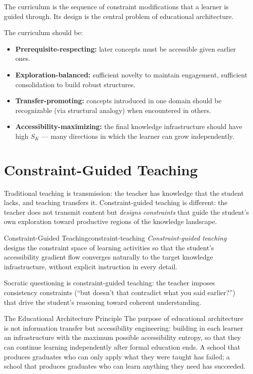 The curriculum is the sequence of constraint modifications that a
learner is guided through. Its design is the central problem of
educational architecture.

The curriculum should be:
\begin{itemize}
  \item \textbf{Prerequisite-respecting:} later concepts must be
        accessible given earlier ones.
  \item \textbf{Exploration-balanced:} sufficient novelty to maintain
        engagement, sufficient consolidation to build robust structures.
  \item \textbf{Transfer-promoting:} concepts introduced in one domain
        should be recognizable (via structural analogy) when encountered
        in others.
  \item \textbf{Accessibility-maximizing:} the final knowledge
        infrastructure should have high $S_K$ — many directions
        in which the learner can grow independently.
\end{itemize}

\section{Constraint-Guided Teaching}

Traditional teaching is transmission: the teacher has knowledge that
the student lacks, and teaching transfers it. Constraint-guided
teaching is different: the teacher does not transmit content but
\emph{designs constraints} that guide the student's own exploration
toward productive regions of the knowledge landscape.

\begin{definition}{Constraint-Guided Teaching}{constraint-teaching}
  \emph{Constraint-guided teaching} designs the constraint space
  of learning activities so that the student's accessibility
  gradient flow converges naturally to the target knowledge
  infrastructure, without explicit instruction in every detail.
\end{definition}

Socratic questioning is constraint-guided teaching: the teacher
imposes consistency constraints (``but doesn't that contradict
what you said earlier?'') that drive the student's reasoning
toward coherent understanding.

\begin{namedthm}{The Educational Architecture Principle}
  The purpose of educational architecture is not information transfer
  but accessibility engineering: building in each learner an infrastructure
  with the maximum possible accessibility entropy, so that they can
  continue learning independently after formal education ends.
  A school that produces graduates who can only apply what they
  were taught has failed; a school that produces graduates who can
  learn anything they need has succeeded.
\end{namedthm}

